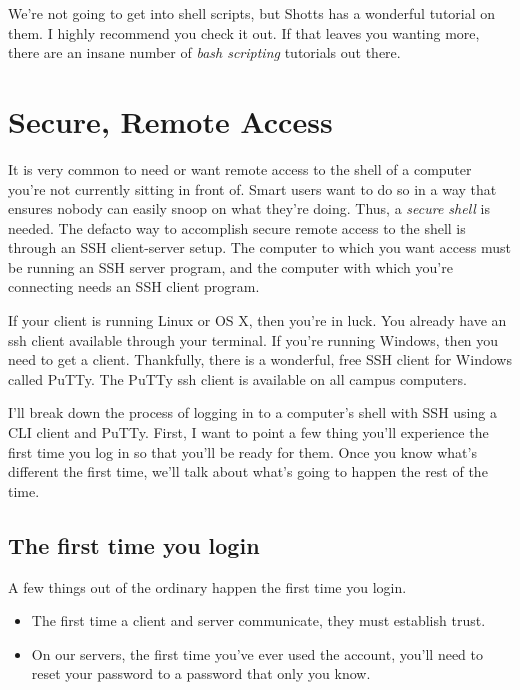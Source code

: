 \documentclass[]{tufte-handout}
\begin{document}
We're not going to get into shell scripts, but Shotts has a wonderful tutorial on them. I highly recommend you check it out.  If that leaves you wanting more, there are an insane number of \textit{bash scripting} tutorials out there.

\section{Secure, Remote Access} 

It is very common to need or want remote access to the shell of a computer you're not currently sitting in front of. Smart users want to do so in a way that ensures nobody can easily snoop on what they're doing. Thus, a \textit{secure shell} is needed. The defacto way to accomplish secure remote access to the shell is through an SSH client-server setup.  The computer to which you want access must be running an SSH server program, and the computer with which you're connecting needs an SSH client program.  

If your client is running Linux or OS X, then you're in luck. You already have an ssh client available through your terminal.  If you're running Windows, then you need to get a client. Thankfully, there is a wonderful, free SSH client for Windows called PuTTy.  The PuTTy ssh client is available on all campus computers. 

I'll break down the process of logging in to a computer's shell with SSH using a CLI client and PuTTy.  First, I want to point a few thing you'll experience the first time you log in so that you'll be ready for them. Once you know what's different the first time, we'll talk about what's going to happen the rest of the time.

\subsection{The first time you login}

A few things out of the ordinary happen the first time you login.  
\begin{itemize}
\item The first time a client and server communicate, they must establish trust.
\item On our servers, the first time you've ever used the account, you'll need to reset your password to a password that only you know. \end{itemize}
\end{document}
